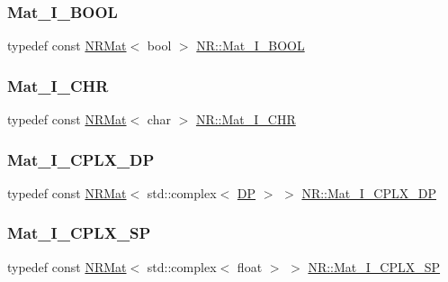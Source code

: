 \mbox{\label{namespaceNR_a466d5c0bd034b0d6de59d8933b425b09}} 
\subsubsection{\texorpdfstring{Mat\_I\_BOOL}{Mat\_I\_BOOL}}
{\footnotesize\ttfamily typedef const \mbox{\hyperlink{classNR_1_1NRMat}{N\+R\+Mat}}$<$ bool $>$ \mbox{\hyperlink{namespaceNR_a466d5c0bd034b0d6de59d8933b425b09}{N\+R\+::\+Mat\+\_\+\+I\+\_\+\+B\+O\+OL}}}

\mbox{\label{namespaceNR_aee0811ffb93cf889082b088ab2e4b37f}} 
\subsubsection{\texorpdfstring{Mat\_I\_CHR}{Mat\_I\_CHR}}
{\footnotesize\ttfamily typedef const \mbox{\hyperlink{classNR_1_1NRMat}{N\+R\+Mat}}$<$ char $>$ \mbox{\hyperlink{namespaceNR_aee0811ffb93cf889082b088ab2e4b37f}{N\+R\+::\+Mat\+\_\+\+I\+\_\+\+C\+HR}}}

\mbox{\label{namespaceNR_ac71d287c73aca6bd25aef6debf83db29}} 
\subsubsection{\texorpdfstring{Mat\_I\_CPLX\_DP}{Mat\_I\_CPLX\_DP}}
{\footnotesize\ttfamily typedef const \mbox{\hyperlink{classNR_1_1NRMat}{N\+R\+Mat}}$<$ std\+::complex$<$ \mbox{\hyperlink{namespaceNR_af6ff762dd605ff477b8e52387253a02a}{DP}} $>$ $>$ \mbox{\hyperlink{namespaceNR_ac71d287c73aca6bd25aef6debf83db29}{N\+R\+::\+Mat\+\_\+\+I\+\_\+\+C\+P\+L\+X\+\_\+\+DP}}}

\mbox{\label{namespaceNR_a0ef9291e459694a91295db095287e78b}} 
\subsubsection{\texorpdfstring{Mat\_I\_CPLX\_SP}{Mat\_I\_CPLX\_SP}}
{\footnotesize\ttfamily typedef const \mbox{\hyperlink{classNR_1_1NRMat}{N\+R\+Mat}}$<$ std\+::complex$<$ float $>$ $>$ \mbox{\hyperlink{namespaceNR_a0ef9291e459694a91295db095287e78b}{N\+R\+::\+Mat\+\_\+\+I\+\_\+\+C\+P\+L\+X\+\_\+\+SP}}}

